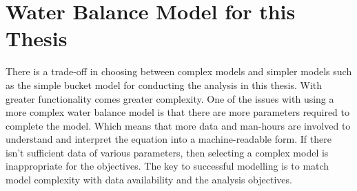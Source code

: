 \section{Water Balance Model for this Thesis}
There is a trade-off in choosing between complex models and simpler models such as the simple bucket model for conducting the analysis in this thesis. With greater functionality comes greater complexity. One of the issues with using a more complex water balance model is that there are more parameters required to complete the model. Which means that more data and man-hours are involved to understand and interpret the equation into a machine-readable form. If there isn't sufficient data of various parameters, then selecting a complex model is inappropriate for the objectives. The key to successful modelling is to match model complexity with data availability and the analysis objectives.
